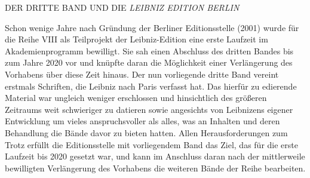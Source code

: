 \thispagestyle{empty}
{\vrule height 0mm depth 30mm width 0mm}
\vspace*{2em}
\par\noindent 
%
%

\noindent\uppercase{Der dritte Band und die \textit{Leibniz Edition Berlin}}
\par
\vspace{1.0ex}
\noindent
\par\noindent
Schon wenige Jahre nach Gründung der Berliner Editionsstelle (2001) wurde für die Reihe VIII als Teilprojekt der Leibniz-Edition eine erste Laufzeit im Akademienprogramm bewilligt. Sie sah einen Abschluss des dritten Bandes bis zum Jahre 2020 vor und knüpfte daran die Möglichkeit einer Verlängerung des Vorhabens über diese Zeit hinaus. 
Der nun vorliegende dritte Band vereint erstmals Schriften, die Leibniz nach Paris verfasst hat. 
Das hierfür zu edierende Material war ungleich weniger erschlossen und hinsichtlich des größeren Zeitraums weit schwieriger zu datieren sowie angesichts von Leibnizens eigener Entwicklung um vieles anspruchsvoller als alles, was an Inhalten und deren Behandlung die Bände davor zu bieten hatten. Allen Herausforderungen zum Trotz erfüllt die Editionsstelle mit vorliegendem Band das Ziel, das für die erste Laufzeit bis 2020 gesetzt war, und kann im Anschluss daran nach der mittlerweile bewilligten Verlängerung des Vorhabens die weiteren Bände der Reihe bearbeiten.  
